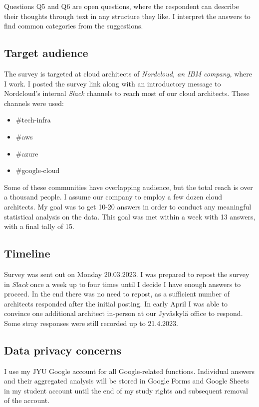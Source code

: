 \documentclass[utf8,english]{gradu3}
\begin{document}
Questions Q5 and Q6 are open questions, where the respondent can describe their
thoughts through text in any structure they like. I interpret the answers to
find common categories from the suggestions.

\subsection{Target audience}
The survey is targeted at cloud architects of \textit{Nordcloud, an IBM
  company}, where I work. I posted the survey link along with an introductory
message to Nordcloud's internal \textit{Slack} channels to reach most of our
cloud architects. These channels were used:
\begin{itemize}
  \item \#tech-infra
  \item \#aws
  \item \#azure
  \item \#google-cloud
\end{itemize}

Some of these communities have overlapping audience, but the total reach is over
a thousand people. I assume our company to employ a few dozen cloud architects.
My goal was to get 10-20 answers in order to conduct any meaningful statistical
analysis on the data. This goal was met within a week with 13 answers, with a
final tally of 15.

\subsection{Timeline}
Survey was sent out on Monday 20.03.2023. I was prepared to repost the survey
in \textit{Slack} once a week up to four times until I decide I have enough
answers to proceed. In the end there was no need to repost, as a sufficient
number of architects responded after the initial posting. In early April I was
able to convince one additional architect in-person at our Jyväskylä office to
respond. Some stray responses were still recorded up to 21.4.2023.

\subsection{Data privacy concerns}
I use my JYU Google account for all Google-related functions. Individual
answers and their aggregated analysis will be stored in Google Forms and Google
Sheets in my student account until the end of my study rights and subsequent
removal of the account.
\end{document}
